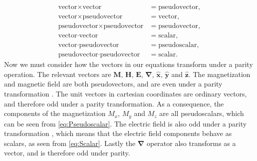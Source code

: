 \begin{subequations}
\begin{align}
    \label{eq:Pseudovector}
    \textrm{vector}\times\textrm{vector} &= \textrm{pseudovector}, \\
    \label{eq:Vector}
    \textrm{vector}\times\textrm{pseudovector} &= \textrm{vector}, \\
    \label{eq:PseudovectorPseudo}
    \textrm{pseudovector}\times\textrm{pseudovector} &= \textrm{pseudovector}, \\
    \label{eq:Scalar}
    \textrm{vector}\cdot\textrm{vector} &= \textrm{scalar}, \\
    \label{eq:Pseudoscalar}
    \textrm{vector}\cdot\textrm{pseudovector} &= \textrm{pseudoscalar}, \\
    \label{eq:ScalarPseudo}
    \textrm{pseudovector}\cdot\textrm{pseudovector} &= \textrm{scalar}.
\end{align}
\end{subequations}
Now we must consider how the vectors in our equations transform under a parity operation. The relevant vectors are $\mathbold{M}$, $\mathbold{H}$, $\mathbold{E}$, $\mathbold{\nabla}$, $\mathbold{\hat{x}}$, $\mathbold{\hat{y}}$ and $\mathbold{\hat{z}}$. The magnetization and magnetic field are both pseudovectors, and are even under a parity transformation \cite{Jackson}. The unit vectors in cartesian coordinates are ordinary vectors, and therefore odd under a parity transformation. As a consequence, the components of the magnetization $M_x$, $M_y$ and $M_z$ are all pseudoscalars, which can be seen from \eqref{eq:Pseudoscalar}. The electric field is also odd under a parity transformation \cite{Jackson}, which means that the electric field components behave as scalars, as seen from \eqref{eq:Scalar}. Lastly the $\mathbold{\nabla}$ operator also transforms as a vector, and is therefore odd under parity.

